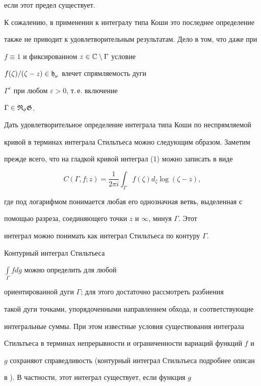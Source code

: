если этот предел существует.





К сожалению, в применении к интегралу типа Коши это последнее определение


также не приводит к удовлетворительным результатам. Дело в том, что даже при


$f\equiv 1$ и фиксированном $z\in {\Bbb C}\setminus\Gamma$ условие


$f(\zeta)/(\zeta - z) \in\operatorname{\frak h}_{\nu}$ влечет спрямляемость дуги


$\Gamma^\varepsilon$ при любом $\varepsilon>0$, т.\,е. включение


$\Gamma\in\operatorname{\frak {R_{0}G}}$.





Дать удовлетворительное определение интеграла типа Коши по неспрямляемой


кривой в терминах интеграла Стильтьеса можно следующим образом. Заметим


прежде всего, что на гладкой кривой интеграл (1) можно записать в виде


$$


C(\Gamma,f;z) = \frac{1}{2\pi i}\int_{\Gamma}


{f(\zeta)d_{\zeta}\log{(\zeta-z)}},


$$


где под логарифмом понимается любая его однозначная ветвь, выделенная с


помощью разреза, соединяющего точки $z$ и $\infty$, минуя $\Gamma$. Этот


интеграл можно понимать как интеграл Стильтьеса по контуру $\Gamma$.


Контурный интеграл Стильтьеса


$\int\limits_{\Gamma}{fdg}$ можно определить для любой


ориентированной дуги $\Gamma$; для этого достаточно рассмотреть разбиения


такой дуги точками, упорядоченными направлением обхода, и соответствующие


интегральные суммы. При этом известные условия существования интеграла


Стильтьеса в терминах непрерывности и ограниченности вариаций функций $f$ и


$g$ сохраняют справедливость (контурный интеграл Стильтьеса подробнее описан


в \cite{K1}). В частности, этот интеграл существует, если функция $g$


